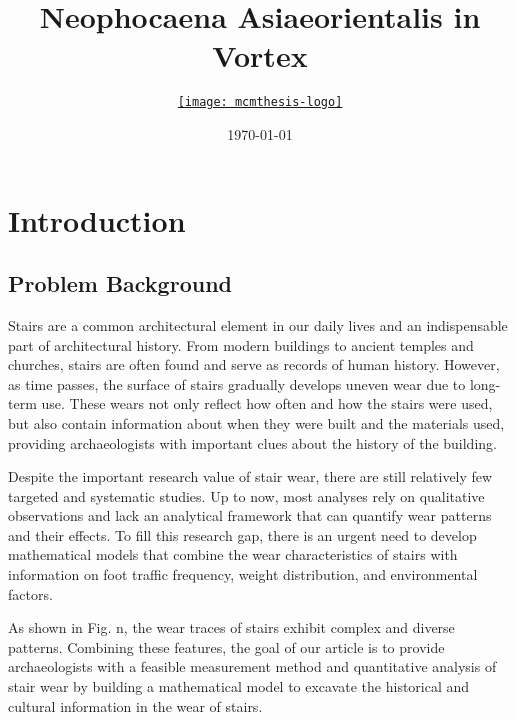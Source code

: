 \documentclass{mcmthesis}
\title{Neophocaena Asiaeorientalis in Vortex}
\author{\small \href{https://www.latexstudio.net/}
  {\texttt{[image: mcmthesis-logo]}}}
\date{\today}
\begin{document}
\begin{abstract}%
    \par       
\begin{keywords}%
               
\end{keywords}
\end{abstract}   

\maketitle
\newpage
\pagestyle{main}
\setcounter{page}{2} %
\tableofcontents

\newpage
\section{Introduction}
\subsection{Problem Background}
Stairs are a common architectural element in our daily lives and an indispensable part of architectural history. From modern buildings to ancient temples and churches, stairs are often found and serve as records of human history. However, as time passes, the surface of stairs gradually develops uneven wear due to long-term use. These wears not only reflect how often and how the stairs were used, but also contain information about when they were built and the materials used, providing archaeologists with important clues about the history of the building.

Despite the important research value of stair wear, there are still relatively few targeted and systematic studies. Up to now, most analyses rely on qualitative observations and lack an analytical framework that can quantify wear patterns and their effects. To fill this research gap, there is an urgent need to develop mathematical models that combine the wear characteristics of stairs with information on foot traffic frequency, weight distribution, and environmental factors.

As shown in Fig. n, the wear traces of stairs exhibit complex and diverse patterns. Combining these features, the goal of our article is to provide archaeologists with a feasible measurement method and quantitative analysis of stair wear by building a mathematical model to excavate the historical and cultural information in the wear of stairs.
\end{document}
